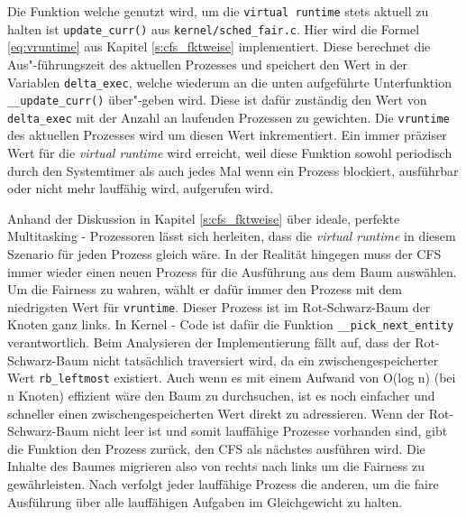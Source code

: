 Die Funktion welche genutzt wird, um die  \texttt{virtual \- runtime} stets aktuell zu halten ist \texttt{update\_curr()} aus \texttt{kernel/sched\_fair.c}. Hier wird die Formel \ref{eq:vruntime} aus Kapitel \ref{s:cfs_fktweise} implementiert. Diese berechnet die Aus"-führungszeit des aktuellen Prozesses und speichert den Wert in der Variablen \texttt{delta\_exec}, welche wiederum an die unten aufgeführte Unterfunktion \texttt{\_\_update\_curr()} über"-geben wird. Diese ist dafür zuständig den Wert von \texttt{delta\-\_exec} mit der Anzahl an laufenden Prozessen zu gewichten. Die \texttt{vruntime} des aktuellen Prozesses wird um diesen Wert inkrementiert.  Ein immer präziser Wert für die \textit{virtual runtime} wird erreicht, weil diese Funktion sowohl periodisch durch den Systemtimer als auch jedes Mal wenn ein Prozess blockiert, ausführbar oder nicht mehr lauffähig wird, aufgerufen wird. 

Anhand der Diskussion in Kapitel \ref{s:cfs_fktweise} über ideale, perfekte Multitasking - Prozessoren lässt sich herleiten, dass die \textit{virtual runtime} in diesem Szenario für jeden Prozess gleich wäre. In der Realität hingegen muss der CFS immer wieder einen neuen Prozess für die Ausführung aus dem Baum auswählen. Um die Fairness zu wahren, wählt er dafür immer den Prozess mit dem niedrigsten Wert für \texttt{vruntime}. Dieser Prozess ist im Rot-Schwarz-Baum der Knoten ganz links. In Kernel - Code ist dafür die Funktion \texttt{\_\_pick\_next\_entity} verantwortlich. Beim Analysieren der Implementierung fällt auf, dass der Rot-Schwarz-Baum nicht tatsächlich traversiert wird, da ein zwischengespeicherter Wert \texttt{rb\_leftmost} existiert. Auch wenn es mit einem Aufwand von O(log n) (bei n Knoten) effizient wäre den Baum zu durchsuchen, ist es noch einfacher und schneller einen zwischengespeicherten Wert direkt zu adressieren. Wenn der Rot-Schwarz-Baum nicht leer ist und somit lauffähige Prozesse vorhanden sind, gibt die Funktion den Prozess zurück, den CFS als nächstes ausführen wird. Die Inhalte des Baumes migrieren also von rechts nach links um die Fairness zu gewährleisten. Nach \cite{mjones} verfolgt jeder lauffähige Prozess die anderen, um die faire Ausführung über alle lauffähigen Aufgaben im Gleichgewicht zu halten.


